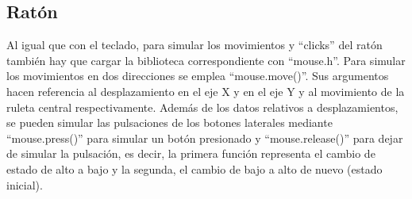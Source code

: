 \subsection{Ratón} \label{s3_6_2}

Al igual que con el teclado, para simular los movimientos y ``clicks'' del ratón también hay que cargar la biblioteca correspondiente con ``mouse.h''. Para simular los movimientos en dos direcciones se emplea ``mouse.move()''. Sus argumentos hacen referencia al desplazamiento en el eje X y en el eje Y y al movimiento de la ruleta central respectivamente. Además de los datos relativos a desplazamientos, se pueden simular las pulsaciones de los botones laterales mediante ``mouse.press()'' para simular un botón presionado y ``mouse.release()'' para dejar de simular la pulsación, es decir, la primera función representa el cambio de estado de alto a bajo y la segunda, el cambio de bajo a alto de nuevo (estado inicial).















